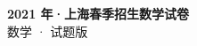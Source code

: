 \documentclass[zihao=-4, a4paper]{ctexart}
\begin{document}
\begin{center}
  {\Large\bfseries 2021 年·上海春季招生数学试卷}\\[4pt]
  {\large 数学 · 试题版}
\end{center}
\medskip
{}

\end{document}
